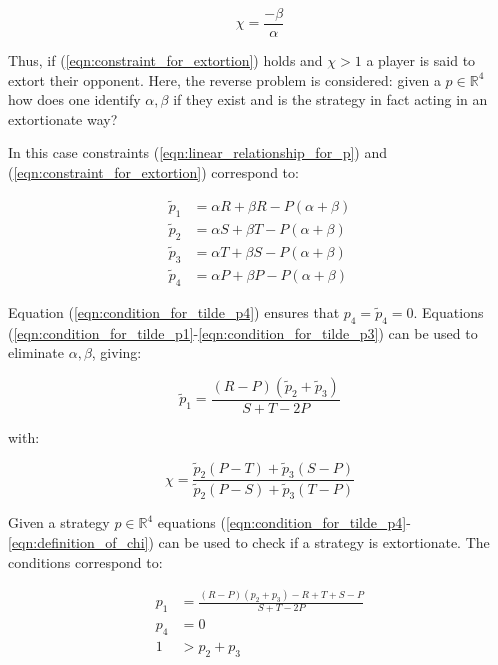 \documentclass[a4paper]{article}
\begin{document}
\begin{equation}\label{eqn:definition_of_chi}
    \chi=\frac{-\beta}{\alpha}
\end{equation}

Thus, if (\ref{eqn:constraint_for_extortion}) holds and \(\chi >1\) a player is
said to extort their opponent.
Here, the reverse problem is considered: given a
\(p\in\mathbb{R}^4\) how does one identify \(\alpha, \beta\) if they
exist and is the strategy in fact acting in an extortionate way?

In this case constraints (\ref{eqn:linear_relationship_for_p}) and
(\ref{eqn:constraint_for_extortion}) correspond to:

\begin{align}
    \tilde p_1 & = \alpha R + \beta R - P (\alpha + \beta)
            \label{eqn:condition_for_tilde_p1}\\
    \tilde p_2 & = \alpha S + \beta T - P (\alpha + \beta)
            \label{eqn:condition_for_tilde_p2}\\
    \tilde p_3 & = \alpha T + \beta S - P (\alpha + \beta)
            \label{eqn:condition_for_tilde_p3}\\
    \tilde p_4 & = \alpha P + \beta P - P (\alpha + \beta)
            \label{eqn:condition_for_tilde_p4}
\end{align}

Equation (\ref{eqn:condition_for_tilde_p4}) ensures that \(p_4=\tilde p_4=0\).
Equations (\ref{eqn:condition_for_tilde_p1}-\ref{eqn:condition_for_tilde_p3})
can be used to eliminate \(\alpha, \beta\), giving:

\begin{equation}\label{eqn:planar_definition_of_extortion}
    \tilde p_1 = \frac{(R - P)(\tilde p_2 + \tilde p_3)}{S + T - 2P}
\end{equation}

with:

\begin{equation}\label{eqn:definition_of_chi}
    \chi = \frac{\tilde p_2 (P - T) + \tilde p_3 (S - P)}
                {\tilde p_2 (P - S) + \tilde p_3 (T - P)}
\end{equation}

Given a strategy \(p\in\mathbb{R}^{4}\) equations
(\ref{eqn:condition_for_tilde_p4}-\ref{eqn:definition_of_chi}) can be used to
check if a strategy is extortionate. The conditions correspond to:

\begin{align}
    p_1 & = \frac{(R-P)(p_2 + p_3) - R + T + S - P}{S + T - 2P}
     \label{eqn:condition_for_p1}\\
    p_4 & = 0 \label{eqn:condition_for_p4}\\
    1 & > p_2 + p_3\label{eqn:condition_for_chi}
\end{align}
\end{document}
